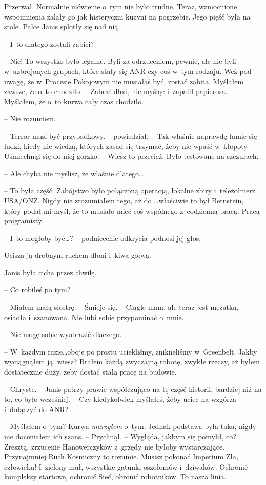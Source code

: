 \documentclass[oneside,polish,11pt,sfheadings]{mwbk}
\begin{document}
Przerwał. Normalnie mówienie o~tym nie było trudne. Teraz, wzmocnione
wspomnienia zalały go jak histeryczni kuzyni na pogrzebie. Jego pięść
była na stole. Palce Janis splotły się nad nią.

-- I~to dlatego zostali zabici?

-- Nie! To wszystko było legalne. Byli za odrzuceniem, pewnie, ale nie
byli w~uzbrojonych grupach, które stały się ANR czy coś w~tym rodzaju.
Weź pod uwagę, że w~Procesie Pokojowym nie musiałaś być, zostać zabita.
Myślałem zawsze, że o~to chodziło. -- Zabrał dłoń, nie myśląc i~zapalił
papierosa. -- Myślałem, że o~to kurwa cały czas chodziło.

-- Nie rozumiem.

-- Terror musi być przypadkowy. -- powiedział. -- Tak właśnie naprawdę
łamie się ludzi, kiedy nie wiedzą, których zasad się trzymać, żeby nie
wpaść w~kłopoty. -- Uśmiechnął się do niej gorzko. -- Wiesz to przecież.
Było testowane na szczurach.

-- Ale chyba nie myślisz, że właśnie dlatego\ldots

-- To była część. Zabójstwo było połączoną operacją, lokalne zbiry i~teleżołnierz USA/ONZ. Nigdy nie zrozumiałem tego, aż do \ldots właściwie to
był Bernstein, który podał mi myśl, że to musiało mieć coś wspólnego z~codzienną pracą. Pracą programisty.

-- I~to mogłoby być\ldots? -- podniecenie odkrycia podnosi jej głos.

Ucisza ją drobnym ruchem dłoni i~kiwa głową.

Janis była cicha przez chwilę.

-- Co robiłeś po tym?

-- Miałem małą siostrę. -- Śmieje się. -- Ciągle mam, ale teraz jest
mężatką, osiadła i~szanowana. Nie lubi sobie przypominać o~mnie.

-- Nie mogę sobie wyobrazić dlaczego.

-- W~każdym razie\ldots oboje po prostu uciekliśmy, zniknęliśmy w~Greenbelt.
Jakby wyciągnąłem ją, wiesz? Brałem każdą zwyczajną robotę, zwykłe
rzeczy, aż byłem dostatecznie duży, żeby dostać stałą pracę na budowie.

-- Chryste. -- Janis patrzy prawie współczująco na tę część historii,
bardziej niż na to, co było wcześniej. -- Czy kiedykolwiek myślałeś, żeby
uciec na wzgórza i~dołączyć do ANR?

-- Myślałem o~tym? Kurwa \emph{marzyłem} o~tym. Jednak podstawa była
taka, nigdy nie doceniałem ich szans. -- Prychnął. -- Wygląda, jakbym się
pomylił, co? Zresztą, zrzucenie Hanowerczyków z~grzędy nie byłoby
wystarczające. Przynajmniej Ruch Kosmiczny to rozumie. Musisz pokonać
Imperium Zła, człowieku! I~zielony muł, wszystkie gatunki oszołomów i~dziwaków. Ochronić kompleksy startowe, ochronić Sieć, obronić
robotników. To nasza linia.
\end{document}
